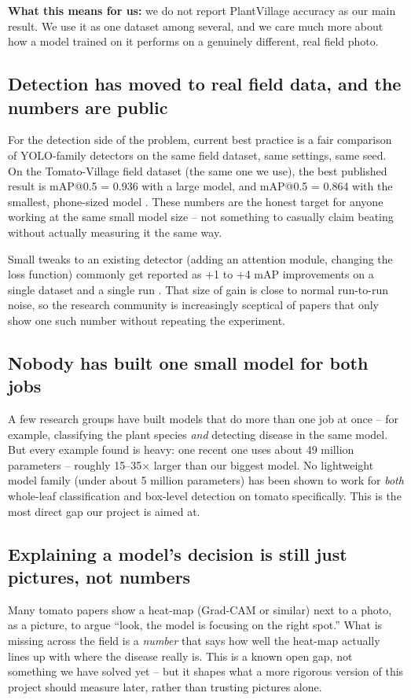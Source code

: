 \documentclass[11pt,a4paper]{article}
\begin{document}
\textbf{What this means for us:} we do not report PlantVillage accuracy as our main
result. We use it as one dataset among several, and we care much more about how a model
trained on it performs on a genuinely different, real field photo.

\subsection{Detection has moved to real field data, and the numbers are public}
For the detection side of the problem, current best practice is a fair comparison of
YOLO-family detectors on the same field dataset, same settings, same seed. On the
Tomato-Village field dataset (the same one we use), the best published result is
mAP@0.5 = 0.936 with a large model, and mAP@0.5 = 0.864 with the smallest, phone-sized
model \cite{ramos2025}. These numbers are the honest target for anyone working at the
same small model size -- not something to casually claim beating without actually
measuring it the same way.

Small tweaks to an existing detector (adding an attention module, changing the loss
function) commonly get reported as +1 to +4 mAP improvements on a single dataset and a
single run \cite{chen2025yolov8n,meng2025}. That size of gain is close to normal
run-to-run noise, so the research community is increasingly sceptical of papers that only
show one such number without repeating the experiment.

\subsection{Nobody has built one small model for both jobs}
A few research groups have built models that do more than one job at once -- for
example, classifying the plant species \emph{and} detecting disease in the same
model. But every example found is heavy: one recent one uses about 49 million
parameters \cite{pmjdm} -- roughly 15--35$\times$ larger than our biggest model. No
lightweight model family (under about 5 million parameters) has been shown to work for
\emph{both} whole-leaf classification and box-level detection on tomato specifically.
This is the most direct gap our project is aimed at.

\subsection{Explaining a model's decision is still just pictures, not numbers}
Many tomato papers show a heat-map (Grad-CAM or similar) next to a photo, as a picture,
to argue ``look, the model is focusing on the right spot.'' What is missing across the
field is a \emph{number} that says how well the heat-map actually lines up with where the
disease really is. This is a known open gap, not something we have solved yet -- but it
shapes what a more rigorous version of this project should measure later, rather than
trusting pictures alone.
\end{document}
